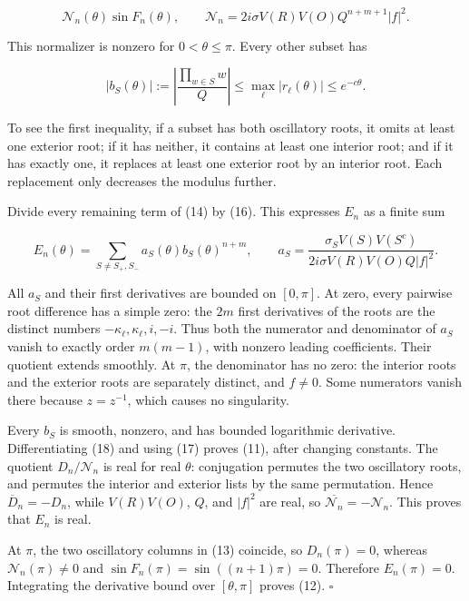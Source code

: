 \documentclass[10pt,a4paper]{article}
\begin{document}
\nopagebreak[3]
\[
\mathcal N_n(\theta)\sin F_n(\theta),\qquad
\mathcal N_n=2i\sigma V(R)V(O)Q^{n+m+1}|f|^2.
\tag{16}
\]

This normalizer is nonzero for \(0<\theta\le\pi\). Every other subset has

\nopagebreak[3]
\[
\left|b_S(\theta)\right|:=\left|\frac{\prod_{w\in S}w}{Q}\right|
\le \max_\ell|r_\ell(\theta)|\le e^{-c\theta}.
\tag{17}
\]

To see the first inequality, if a subset has both oscillatory roots, it omits at least one exterior root; if it has neither, it contains at least one interior root; and if it has exactly one, it replaces at least one exterior root by an interior root. Each replacement only decreases the modulus further.

Divide every remaining term of (14) by (16). This expresses \(E_n\) as a finite sum

\nopagebreak[3]
\[
E_n(\theta)=\sum_{S\ne S_+,S_-}a_S(\theta)b_S(\theta)^{n+m},
\qquad
a_S=\frac{\sigma_S V(S)V(S^c)}{2i\sigma V(R)V(O)Q|f|^2}.
\tag{18}
\]

All \(a_S\) and their first derivatives are bounded on \([0,\pi]\). At zero, every pairwise root difference has a simple zero: the \(2m\) first derivatives of the roots are the distinct numbers \(-\kappa_\ell,\kappa_\ell,i,-i\). Thus both the numerator and denominator of \(a_S\) vanish to exactly order \(m(m-1)\), with nonzero leading coefficients. Their quotient extends smoothly. At \(\pi\), the denominator has no zero: the interior roots and the exterior roots are separately distinct, and \(f\ne0\). Some numerators vanish there because \(z=z^{-1}\), which causes no singularity.

Every \(b_S\) is smooth, nonzero, and has bounded logarithmic derivative. Differentiating (18) and using (17) proves (11), after changing constants. The quotient \(D_n/\mathcal N_n\) is real for real \(\theta\): conjugation permutes the two oscillatory roots, and permutes the interior and exterior lists by the same permutation. Hence \(\overline D_n=-D_n\), while \(V(R)V(O)\), \(Q\), and \(|f|^2\) are real, so \(\overline{\mathcal N_n}=-\mathcal N_n\). This proves that \(E_n\) is real.

At \(\pi\), the two oscillatory columns in (13) coincide, so \(D_n(\pi)=0\), whereas \(\mathcal N_n(\pi)\ne0\) and \(\sin F_n(\pi)=\sin((n+1)\pi)=0\). Therefore \(E_n(\pi)=0\). Integrating the derivative bound over \([\theta,\pi]\) proves (12). \(\square\)

\end{document}
